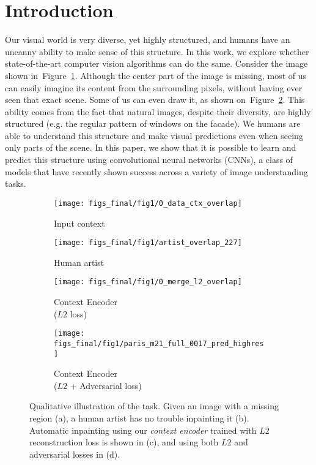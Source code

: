 \documentclass[10pt,twocolumn,letterpaper]{article}
\newcommand{\reffig}[1]{Figure~\ref{fig:#1}}
\newcommand{\lblfig}[1]{\label{fig:#1}}
\begin{document}
\section{Introduction}
Our visual world is very diverse, yet highly structured, and
humans have an uncanny ability to make sense of this structure.
In this work, we explore whether state-of-the-art computer vision algorithms can do the same.
Consider the image shown in~\reffig{teaser_input}.
Although the center part of the image is missing, most of us can easily imagine its content from the surrounding pixels, without having ever seen that exact scene. Some of us can even draw it, as shown on~\reffig{teaser_artist}.
This ability comes from the fact that natural images, despite their diversity, are highly structured (e.g. the regular pattern of windows on the facade).
We humans are able to understand this structure and make visual predictions even when seeing only parts of the scene.
In this paper, we show that it is possible to learn and predict this structure using convolutional neural networks (CNNs), a class of models that have recently shown success across a variety of image understanding tasks.
\begin{figure}
\vspace{-.8em}
\captionsetup[subfigure]{justification=centering}
  \begin{subfigure}[b]{.49\columnwidth}
    \centering
    \texttt{[image: figs\_final/fig1/0\_data\_ctx\_overlap]}
    \caption{Input context}
    \lblfig{teaser_input}
  \end{subfigure}
  \begin{subfigure}[b]{.49\columnwidth}
    \centering
    \texttt{[image: figs\_final/fig1/artist\_overlap\_227]}
    \caption{Human artist}
    \lblfig{teaser_artist}
  \end{subfigure}
  \vspace{0.8mm}

  \begin{subfigure}[b]{.49\columnwidth}
    \centering
    \texttt{[image: figs\_final/fig1/0\_merge\_l2\_overlap]}
    \caption{Context Encoder\\($L2$ loss)}
    \lblfig{teaser_rec}
  \end{subfigure}
  \begin{subfigure}[b]{.49\columnwidth}
    \centering
    \texttt{[image: figs\_final/fig1/paris\_m21\_full\_0017\_pred\_highres]}
    \caption{Context Encoder\\($L2$ + Adversarial loss)}
    \lblfig{teaser_adv}
  \end{subfigure}
\vspace{-0.5em}
  \caption{Qualitative illustration of the task. Given an image with a missing region (a), a human artist has no trouble inpainting it (b).  Automatic inpainting using our \textit{context encoder} trained with $L2$ reconstruction loss is shown in (c), and using both $L2$ and adversarial losses in (d).}
  \lblfig{teaser}
\vspace{-.6em}
\end{figure}
\end{document}
